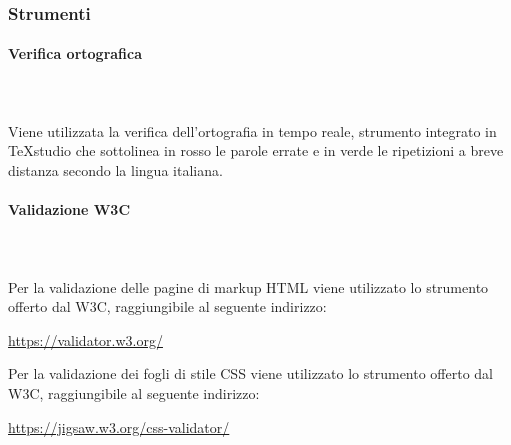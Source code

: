 {		
			
	\subsubsection{Strumenti}
		\paragraph{Verifica ortografica} \mbox{}\\ \mbox{}\\
		Viene utilizzata la verifica dell'ortografia in tempo reale, strumento integrato in \TeX{}studio che sottolinea in rosso le parole errate e in verde le ripetizioni a breve distanza secondo la lingua italiana.
		\paragraph{Validazione W3C} \mbox{}\\ \mbox{}\\
		Per la validazione delle pagine di markup HTML viene utilizzato lo strumento offerto dal W3C, raggiungibile al seguente indirizzo: \newline
		\centerline{\url{https://validator.w3.org/}} \newline \newline
		Per la validazione dei fogli di stile CSS viene utilizzato lo strumento offerto dal W3C, raggiungibile al seguente indirizzo: \newline
		\centerline{\url{https://jigsaw.w3.org/css-validator/}} \newline


}
